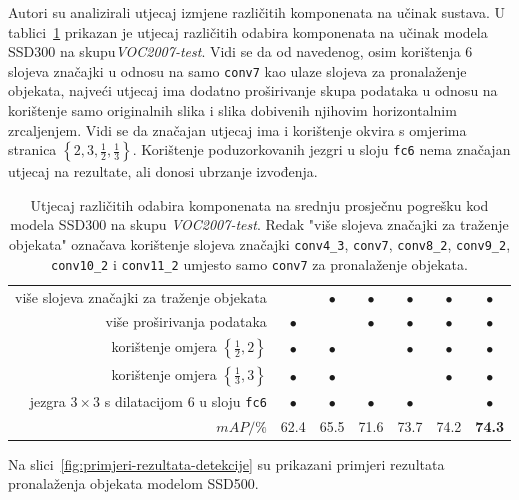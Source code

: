 \documentclass[utf8, seminar, numeric, lmodern]{feri}
\begin{document}
Autori su analizirali utjecaj izmjene različitih komponenata na učinak sustava. U tablici~\ref{tab:kanaliza-komponenata} prikazan je utjecaj različitih odabira komponenata na učinak modela SSD300 na skupu\emph{VOC2007-test}. Vidi se da od navedenog, osim korištenja $6$ slojeva značajki u odnosu na samo \texttt{conv7} kao ulaze slojeva za pronalaženje objekata, najveći utjecaj ima dodatno proširivanje skupa podataka u odnosu na korištenje samo originalnih slika i slika dobivenih njihovim horizontalnim zrcaljenjem. Vidi se da značajan utjecaj ima i korištenje okvira s omjerima stranica $\left\{2,3,\frac{1}{2},\frac{1}{3}\right\}$. Korištenje poduzorkovanih jezgri u sloju \texttt{fc6} nema značajan utjecaj na rezultate, ali donosi ubrzanje izvođenja.

\begin{table}
	\centering
	\begin{tabular}{|r|cccccc|}
		\hline
		više slojeva značajki za traženje objekata & & $\bullet$ & $\bullet$ & $\bullet$ & $\bullet$ & $\bullet$ \\
		više proširivanja podataka & $\bullet$ & & $\bullet$ & $\bullet$ & $\bullet$ & $\bullet$ \\
		korištenje omjera $\left\{\frac{1}{2},2\right\}$ & $\bullet$ & $\bullet$ & & $\bullet$ & $\bullet$ & $\bullet$ \\
		korištenje omjera $\left\{\frac{1}{3},3\right\}$ & $\bullet$ & $\bullet$ & & & $\bullet$ & $\bullet$ \\
		jezgra $3\times 3$ s dilatacijom 6 u sloju \texttt{fc6} & $\bullet$ & $\bullet$ & $\bullet$ & $\bullet$ & & $\bullet$ \\
		\hline
		$\textit{mAP}/\%$ & 62.4 & 65.5 & 71.6 & 73.7 & 74.2 & \textbf{74.3} \\
		\hline
	\end{tabular}
	\caption{Utjecaj različitih odabira komponenata na srednju prosječnu pogrešku kod modela SSD300 na skupu \emph{VOC2007-test}. Redak "više slojeva značajki za traženje objekata" označava korištenje slojeva značajki \texttt{conv4\_3}, \texttt{conv7}, \texttt{conv8\_2}, \texttt{conv9\_2}, \texttt{conv10\_2} i \texttt{conv11\_2} umjesto samo \texttt{conv7} za pronalaženje objekata.}
	\label{tab:kanaliza-komponenata}
\end{table}

Na slici~\ref{fig:primjeri-rezultata-detekcije} su prikazani primjeri rezultata pronalaženja objekata modelom SSD500.
\end{document}
